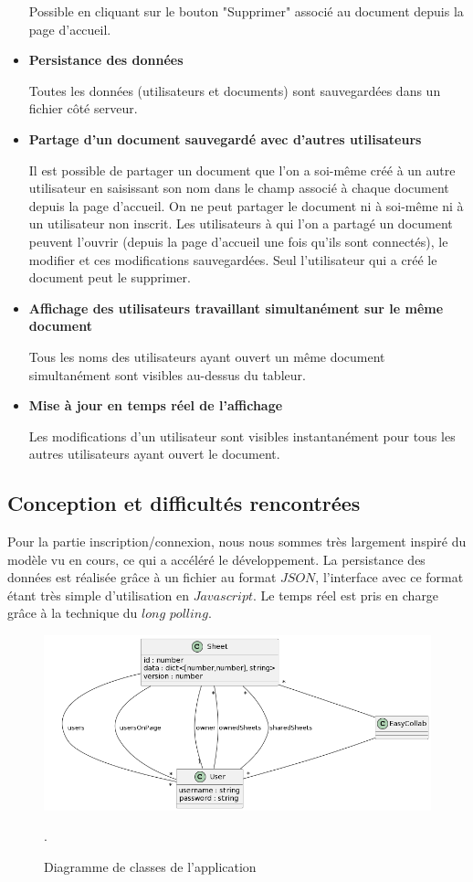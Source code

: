 \documentclass[11pt, letterpaper]{article}
\begin{document}
\begin{itemize}
Possible en cliquant sur le bouton "Supprimer" associé au document depuis la page d'accueil.

\item \textbf{Persistance des données}

Toutes les données (utilisateurs et documents) sont sauvegardées dans un fichier côté serveur.

\item \textbf{Partage d'un document sauvegardé avec d'autres utilisateurs}

Il est possible de partager un document que l'on a soi-même créé à un autre utilisateur en saisissant son nom dans le champ associé à chaque document depuis la page d'accueil. On ne peut partager le document ni à soi-même ni à un utilisateur non inscrit. Les utilisateurs à qui l'on a partagé un document peuvent l'ouvrir (depuis la page d'accueil une fois qu'ils sont connectés), le modifier et ces modifications sauvegardées.
Seul l'utilisateur qui a créé le document peut le supprimer.

\item \textbf{Affichage des utilisateurs travaillant simultanément sur le même document}

Tous les noms des utilisateurs ayant ouvert un même document simultanément sont visibles au-dessus du tableur.

\item \textbf{Mise à jour en temps réel de l'affichage}

Les modifications d'un utilisateur sont visibles instantanément pour tous les autres utilisateurs ayant ouvert le document.
\end{itemize}

\subsection{Conception et difficultés rencontrées}

Pour la partie inscription/connexion, nous nous sommes très largement inspiré du modèle vu en cours, ce qui a accéléré le développement. La persistance des données est réalisée grâce à un fichier au format $JSON$, l'interface avec ce format étant très simple d'utilisation en $Javascript$. Le temps réel est pris en charge grâce à la technique du $long$ $polling$.

\begin{figure}[htp]
    \centering
    \includegraphics[width=14cm]{images/class_diagram.png}
    \caption{Diagramme de classes de l'application}.
\end{figure}
\end{document}
